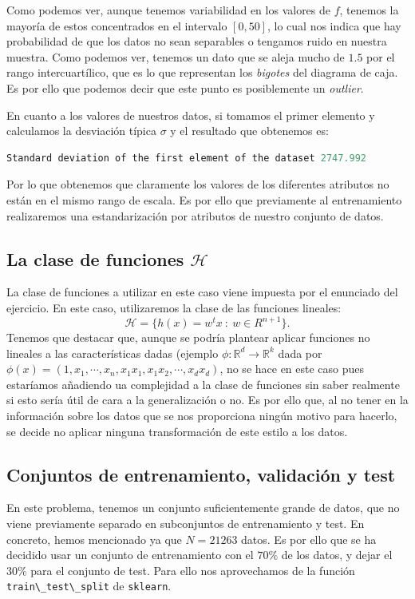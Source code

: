 \documentclass[a4paper, 20pt]{article}
\newcommand{\R}{\mathbb R}
\begin{document}
Como podemos ver, aunque tenemos variabilidad en los valores de $f$, tenemos la mayoría de estos concentrados en el intervalo $[0,50]$, lo cual nos indica que hay probabilidad de que los datos no sean separables o tengamos ruido en nuestra muestra. Como podemos ver, tenemos un dato que se aleja mucho de $1.5$ por el rango intercuartílico, que es lo que representan los \emph{bigotes} del diagrama de caja. Es por ello que podemos decir que este punto es posiblemente un \emph{outlier}.

En cuanto a los valores de nuestros datos, si tomamos el primer elemento y calculamos la desviación típica $\sigma$ y el resultado que obtenemos es:
\begin{lstlisting}[language = Python]
  Standard deviation of the first element of the dataset 2747.992
\end{lstlisting}Por lo que obtenemos que claramente los valores de los diferentes atributos no están en el mismo rango de escala. Es por ello que previamente al entrenamiento realizaremos una estandarización por atributos de nuestro conjunto de datos.

\subsection{La clase de funciones $\mathcal H$}

La clase de funciones a utilizar en este caso viene impuesta por el enunciado del ejercicio. En este caso, utilizaremos la clase de las funciones lineales:
$$
\mathcal H = \{ h(x) = w^t x \ : \ w \in R^{n+1}\}.
$$
Tenemos que destacar que, aunque se podría plantear aplicar funciones no lineales a las características dadas (ejemplo $\phi :\R^d \to \R^{k}$ dada por $\phi(x) = (1,x_1,\cdots,x_n,x_1x_1,x_1x_2,\cdots,x_dx_d)$, no se hace en este caso pues estaríamos añadiendo ua complejidad a la clase de funciones sin saber realmente si esto sería útil de cara a la generalización o no. Es por ello que, al no tener en la información sobre los datos que se nos proporciona ningún motivo para hacerlo, se decide no aplicar ninguna transformación de este estilo a los datos.

\subsection{Conjuntos de entrenamiento, validación y test}

En este problema, tenemos un conjunto suficientemente grande de datos, que no viene previamente separado en subconjuntos de entrenamiento y test. En concreto, hemos mencionado ya que $N = 21263$ datos. Es por ello que se ha decidido usar un conjunto de entrenamiento con el $70\%$ de los datos, y dejar el $30\%$ para el conjunto de test. Para ello nos aprovechamos de la función \lstinline{train\_test\_split} de \lstinline{sklearn}.
\end{document}
